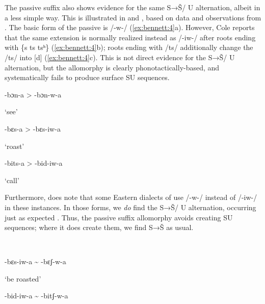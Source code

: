 \ea\label{ex:bennett:3}
\ea\label{ex:bennett:3a}

\ex\label{ex:bennett:3b}

\ex\label{ex:bennett:3c}

\z
\z

The passive suffix also shows evidence for the same S→Š/ {\longrule} U alternation, albeit in a less simple way. This is illustrated in  and , based on data and observations from \citet[193--195]{Cole1955}. The basic form of the passive is /-w-/ (\ref{ex:bennett:4}a). However, Cole reports that the same extension is normally realized instead as /-iw-/ after roots ending with \{s ts tsʰ\} (\ref{ex:bennett:4}b); roots ending with /ts/ additionally change the /ts/ into [d] (\ref{ex:bennett:4}c). This is not direct evidence for the S→Š/ {\longrule} U alternation, but the allomorphy is clearly phonotactically-based, and systematically fails to produce surface SU sequences.

\ea\label{ex:bennett:4}
\ea\label{ex:bennett:4a}

-bɔn-a  >  -bɔn-w-a

     ‘see’
\ex\label{ex:bennett:4b}

-bɛs-a  >  -bɛs-iw-a

     ‘roast’
\ex\label{ex:bennett:4c}

-bits-a  >  -bid-iw-a

     ‘call’\\
\z
\z

Furthermore, \citet{Cole1955} does note that some Eastern dialects of  use /-w-/ instead of /-iw-/ in these instances. In those forms, we \textit{do} find the S→Š/ {\longrule} U alternation, occurring just as expected . Thus, the passive suffix allomorphy avoids creating SU sequences; where it does create them, we find S→Š as usual.

\ea\label{ex:bennett:5}
\\
\ea\label{ex:bennett:5a}

-bɛs-iw-a {\textasciitilde} -bɛʃ-w-a

     ‘be roasted’\\
\ex\label{ex:bennett:5b}

-bid-iw-a  {\textasciitilde} -bitʃ-w-a

